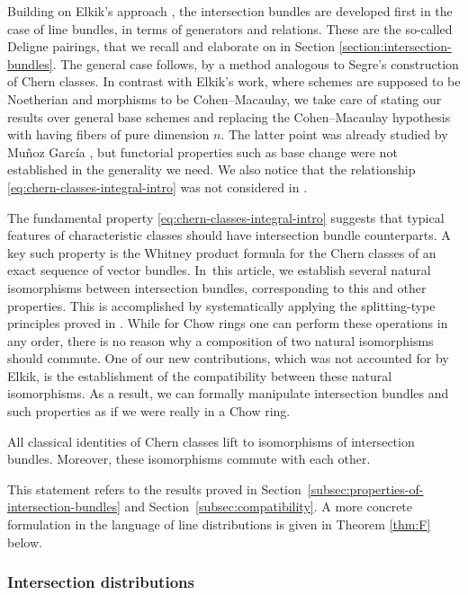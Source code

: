 Building on Elkik's approach \cite{Elkikfib}, the intersection bundles are developed first in the case of line bundles, in terms of generators and relations. These are the so-called Deligne pairings, that we recall and elaborate on in Section \ref{section:intersection-bundles}. The general case follows, by a method analogous to Segre's construction of Chern classes. In contrast with Elkik's work, where schemes are supposed to be Noetherian and morphisms to be Cohen--Macaulay, we take care of stating our results over general base schemes and replacing the Cohen--Macaulay hypothesis with having fibers of pure dimension $n$. The latter point was already studied by Muñoz García \cite{Munoz}, but functorial properties such as base change were not established in the generality we need. We also notice that the relationship \eqref{eq:chern-classes-integral-intro} was not considered in \cite{Elkikfib, Munoz}.

The fundamental property \eqref{eq:chern-classes-integral-intro} suggests that typical features of characteristic classes should have intersection bundle counterparts. A key such property is the Whitney product formula for the Chern classes of an exact sequence of vector bundles. In~this article, we establish several natural isomorphisms between intersection bundles, corresponding to this and other properties. This is accomplished by systematically applying the splitting-type principles proved in \cite{Eriksson-Freixas-Wentworth}. While for Chow rings one can perform these operations in any order, there is no reason why a composition of two natural isomorphisms should commute. One of our new contributions, which was not accounted for by Elkik, is the establishment of the compatibility between these natural isomorphisms. As a result, we can formally manipulate intersection bundles and such properties as if we were really in a Chow ring.

\begin{thm}\label{thm:D}
All classical identities of Chern classes lift to isomorphisms of intersection bundles. Moreover, these isomorphisms commute with each other.
\end{thm}
This statement refers to the results proved in Section~\ref{subsec:properties-of-intersection-bundles} and Section~\ref{subsec:compatibility}. A more concrete formulation in the language of line distributions is given in Theorem \ref{thm:F} below.

\subsubsection*{Intersection distributions}

